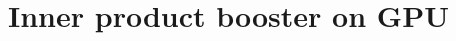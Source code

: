 \documentclass[oribibl]{llncs2e/llncs}
\begin{document}



\section{Inner product booster on GPU}

\end{document}
